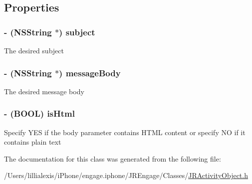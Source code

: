 \subsection{Properties}
\hypertarget{interface_j_r_email_object_a618a23c34ede4a4eb56ed6cf05d91b64}{
\subsubsection[{subject}]{\setlength{\rightskip}{0pt plus 5cm}-\/ (NSString $\ast$) subject}}
\label{interface_j_r_email_object_a618a23c34ede4a4eb56ed6cf05d91b64}
The desired subject \hypertarget{interface_j_r_email_object_ad0e6a07cb2aec3cf6eee75d2ace32e7d}{
\subsubsection[{messageBody}]{\setlength{\rightskip}{0pt plus 5cm}-\/ (NSString $\ast$) messageBody}}
\label{interface_j_r_email_object_ad0e6a07cb2aec3cf6eee75d2ace32e7d}
The desired message body \hypertarget{interface_j_r_email_object_af372942f67fba5e93fb2b53f4ee8a3c5}{
\subsubsection[{isHtml}]{\setlength{\rightskip}{0pt plus 5cm}-\/ (BOOL) isHtml}}
\label{interface_j_r_email_object_af372942f67fba5e93fb2b53f4ee8a3c5}
Specify YES if the body parameter contains HTML content or specify NO if it contains plain text 

The documentation for this class was generated from the following file:\begin{DoxyCompactItemize}
\item 
/Users/lillialexis/iPhone/engage.iphone/JREngage/Classes/\hyperlink{_j_r_activity_object_8h}{JRActivityObject.h}\end{DoxyCompactItemize}
